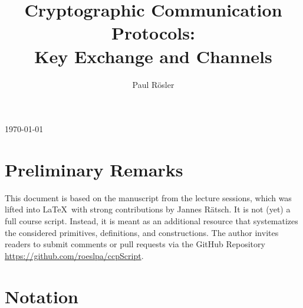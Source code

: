 \documentclass[a4paper,orivec]{llncs}
\title{Cryptographic Communication Protocols:\\Key Exchange and Channels}
\author{Paul Rösler}
\institute{FAU Erlangen-Nürnberg}
\begin{document}
\maketitle
\begin{center}
    \today
\end{center}

\begingroup
\let\clearpage\relax
\tableofcontents
\endgroup




\section{Preliminary Remarks}
This document is based on the manuscript from the lecture sessions, which was lifted into \LaTeX\ with strong contributions by Jannes Rätsch.
It is not (yet) a full course script.
Instead, it is meant as an additional resource that systematizes the considered primitives, definitions, and constructions.
The author invites readers to submit comments or pull requests via the GitHub Repository \url{https://github.com/roeslpa/ccpScript}.


\section{Notation}
\end{document}
